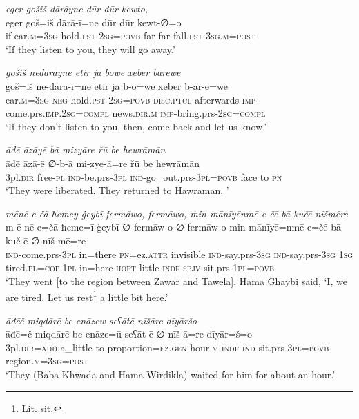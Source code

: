 \ea \label{BP.163}
\textit{eger gošiš dārāyne dūr dūr kewto,} \\ 
\gll eger goš=iš dārā-ī=ne dūr dūr kewt-∅=o \\ 
 if ear\textsc{.m}\textsc{=3sg} hold\textsc{.pst}-\textsc{2sg}\textsc{=\textsc{povb}} far far fall\textsc{.pst}\textsc{-3sg}\textsc{.m}\textsc{=\textsc{post}} \\ 
\glt `If they listen to you, they will go away.'
\z 
 
\ea \label{BP.164}
\textit{gošiš nedārāyne ētir jā bowe xeber bārewe} \\ 
\gll goš=iš ne-dārā-ī=ne ētir jā b-o=we xeber b-ār-e=we \\ 
 ear\textsc{.m}\textsc{=3sg} \textsc{neg-}hold\textsc{.pst}-\textsc{2sg}\textsc{=\textsc{povb}} \textsc{disc.ptcl} afterwards \textsc{imp-}come.prs\textsc{.imp}\textsc{.\textsc{2sg}}\textsc{=compl} news\textsc{.dir}\textsc{.m} \textsc{imp-}bring.prs-\textsc{2sg}\textsc{=compl} \\ 
\glt `If they don’t listen to you, then, come back and let us know.'
\z 
 
\ea \label{BP.175}
\textit{āđē āzāyē bā mizyāre řū be hewrāmān} \\ 
\gll āđē āzā-ē ∅-b-ā mi-zye-ā=re řū be hewrāmān \\ 
 3pl\textsc{.dir} free\textsc{\textsc{-pl}} \textsc{ind-}be.prs\textsc{-3pl} \textsc{ind-}go\_out.prs\textsc{-3pl}\textsc{=\textsc{povb}} face to \textsc{pn} \\ 
\glt `They were liberated. They returned to Hawraman. '
\z 
 
\ea \label{BP.181}
\textit{mēnē e čā ħemey ġeybī fermāwo, fermāwo, min mānīyēnmē e čē bā kučē nīšmēre} \\ 
\gll m-ē-nē e=čā ħeme=ī ġeybī ∅-fermāw-o ∅-fermāw-o min mānīyē=nmē e=čē bā kuč-ē ∅-nīš-mē=re \\ 
 \textsc{ind-}come.prs\textsc{-3pl} in=there \textsc{pn}=ez.\textsc{attr} invisible \textsc{ind-}say.prs\textsc{-3sg} \textsc{ind-}say.prs\textsc{-3sg} \textsc{1sg} tired\textsc{.pl}\textsc{=cop}\textsc{.\textsc{1pl}} in=here \textsc{hort} little\textsc{-indf} \textsc{sbjv-}sit.prs\textsc{-\textsc{1pl}}\textsc{=\textsc{povb}} \\ 
\glt `They went [to the region between Zawar and Tawela]. Hama Ghaybi said, ‘I, we are tired. Let us rest\footnote{Lit. sit.} a little bit here.'
\z 
 
\ea \label{BP.189}
\textit{āđēč miqdārē be enāzew seʕātē nīšāre dīyāršo} \\ 
\gll āđē=č miqdārē be enāze=ū seʕāt-ē ∅-nīš-ā=re dīyār=š=o \\ 
 3pl\textsc{.dir}\textsc{=add} a\_little to proportion\textsc{=ez.gen} hour\textsc{.m}\textsc{-indf} \textsc{ind-}sit.prs\textsc{-3pl}\textsc{=\textsc{povb}} region\textsc{.m}\textsc{=3sg}\textsc{=\textsc{post}} \\ 
\glt `They (Baba Khwada and Hama Wirdikla) waited for him for about an hour.'
\z 
 

